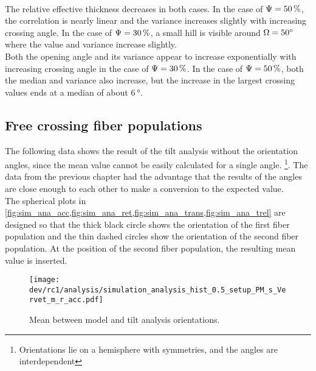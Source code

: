 \\
The relative effective thickness \trel{} decreases in both cases.
In the case of $\textnormal{$\Psi$} = \SI{50}{\percent}$, the correlation is nearly linear and the variance increases slightly with increasing crossing angle.
In the case of $\textnormal{$\Psi$} = \SI{30}{\percent}$, a small hill is visible around $\textnormal{$\Omega$} = \SI{50}{\degree}$ where the value and variance increase slightly.
\\
Both the opening angle and its variance appear to increase exponentially with increasing crossing angle in the case of $\textnormal{$\Psi$} = \SI{30}{\percent}$.
In the case of $\textnormal{$\Psi$} = \SI{50}{\percent}$, both the median and variance also increase, but the increase in the largest crossing values ends at a median of about $\SI{6}{\degree}$.
%
\subsection{Free crossing fiber populations}
\label{sec:resFreeCross}
%
The following data shows the result of the tilt analysis without the orientation angles, since the mean value cannot be easily calculated for a single angle. \footnote{Orientations lie on a hemisphere with symmetries, and the angles are interdependent}.
The data from the previous chapter had the advantage that the results of the angles are close enough to each other to make a conversion to the expected value.
\\
%
The spherical plots in \cref{fig:sim_ana_acc,fig:sim_ana_ret,fig:sim_ana_trans,fig:sim_ana_trel} are designed so that the thick black circle shows the orientation of the first fiber population and the thin dashed circles show the orientation of the second fiber population.
At the position of the second fiber population, the resulting mean value is inserted.
%
%
%
\begin{figure}[!p]
\centering
\texttt{[image: dev/rc1/analysis/simulation\_analysis\_hist\_0.5\_setup\_PM\_s\_Vervet\_m\_r\_acc.pdf]}
\caption[Simulation acc]{Mean \acc{} between model and tilt analysis orientations.}
\label{fig:sim_ana_acc}
\end{figure}
%
